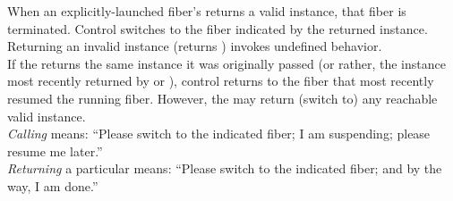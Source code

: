 When an explicitly-launched fiber's \entryfn\xspace returns a valid \fiber
instance, that fiber is terminated. Control switches to the fiber indicated by
the returned \fiber instance.\\

Returning an invalid \fiber instance (\opbool returns ) invokes
undefined behavior.\\

If the \entryfn\xspace returns the same \fiber instance it was originally
passed (or rather, the \fiber instance most recently returned by \resume
or \resumewith), control returns to the fiber that most recently resumed the
running fiber. However, the \entryfn\xspace may return (switch to) any
reachable valid \fiber instance.\\

\emph{Calling} \resume means: ``Please switch to the indicated fiber; I
am suspending; please resume me later.''\\

\emph{Returning} a particular \fiber means: ``Please switch to the indicated
fiber; and by the way, I am done.''
